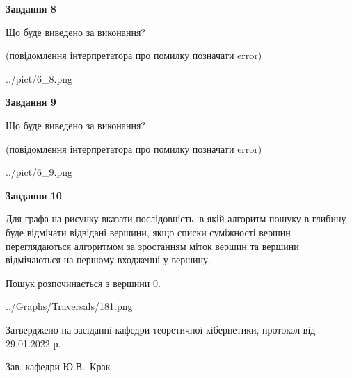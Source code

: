 \documentclass[12pt, ukrainian]{article}
\begin{document}
{\begin {large}
{\begin {center}\textbf{Завдання 8}\end {center}}\par
Що буде виведено за виконання?\par
 (повідомлення інтерпретатора про помилку позначати error)\par
\begin{center}
	{../pict/6_8.png}
\end{center}
\newpage

{\begin {center}\textbf{Завдання 9}\end {center}}\par
Що буде виведено за виконання?\par
 (повідомлення інтерпретатора про помилку позначати error)\par
\begin{center}
	{../pict/6_9.png}
\end{center}
\newpage

{\begin {center}\textbf{Завдання 10}\end {center}}\par
Для графа на рисунку вказати послідовність, в якій алгоритм пошуку в глибину буде відмічати відвідані вершини, якщо списки суміжності вершин переглядаються алгоритмом за зростанням міток вершин та вершини відмічаються на першому вход\-женні у вершину.\par
Пошук розпочинається з вершини 0.\par

\begin{center}
	{../Graphs/Traversals/181.png}
\end{center}\par
\newpage


\end {large}
}
{\smallskip \begin {small} Затверджено на засіданні кафедри теоретичної кібернетики, протокол  від   29.01.2022 р.\par\smallskip\smallskip
{\parbox {6.5 cm}{Зав. кафедри \dotfill Ю.В.~Крак}} \end{small}}
\end{document}
